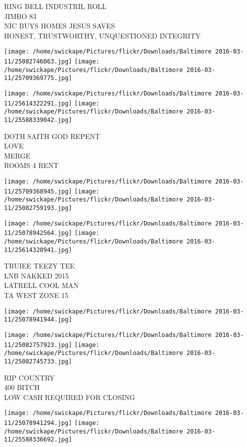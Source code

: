 \documentclass[10pt,letterpaper]{article}
\begin{document}
RING BELL INDUSTRIL ROLL\\
JIMBO 83\\
NIC BUYS HOMES JESUS SAVES\\
HONEST, TRUSTWORTHY, UNQUESTIONED INTEGRITY
\pagebreak

\texttt{[image: /home/swickape/Pictures/flickr/Downloads/Baltimore 2016-03-11/25082746063.jpg]}
\texttt{[image: /home/swickape/Pictures/flickr/Downloads/Baltimore 2016-03-11/25709369775.jpg]}

\texttt{[image: /home/swickape/Pictures/flickr/Downloads/Baltimore 2016-03-11/25614322291.jpg]}
\texttt{[image: /home/swickape/Pictures/flickr/Downloads/Baltimore 2016-03-11/25588339042.jpg]}

DOTH SAITH GOD REPENT\\
LOVE\\
MERGE\\
ROOMS 4 RENT
\pagebreak

\texttt{[image: /home/swickape/Pictures/flickr/Downloads/Baltimore 2016-03-11/25709368945.jpg]}
\texttt{[image: /home/swickape/Pictures/flickr/Downloads/Baltimore 2016-03-11/25082759193.jpg]}

\texttt{[image: /home/swickape/Pictures/flickr/Downloads/Baltimore 2016-03-11/25078942564.jpg]}
\texttt{[image: /home/swickape/Pictures/flickr/Downloads/Baltimore 2016-03-11/25614320941.jpg]}

TRUIEE TEEZY TEE\\
LNB NAKKED 2015\\
LATRELL COOL MAN\\
TA WEST ZONE 15
\pagebreak

\texttt{[image: /home/swickape/Pictures/flickr/Downloads/Baltimore 2016-03-11/25078941944.jpg]}

\vspace{0.25in}
\texttt{[image: /home/swickape/Pictures/flickr/Downloads/Baltimore 2016-03-11/25082757923.jpg]}
\texttt{[image: /home/swickape/Pictures/flickr/Downloads/Baltimore 2016-03-11/25082745733.jpg]}

RIP COUNTRY\\
400 BITCH\\
LOW CASH REQUIRED FOR CLOSING
\pagebreak

\texttt{[image: /home/swickape/Pictures/flickr/Downloads/Baltimore 2016-03-11/25078941294.jpg]}
\texttt{[image: /home/swickape/Pictures/flickr/Downloads/Baltimore 2016-03-11/25588336692.jpg]}
\end{document}
